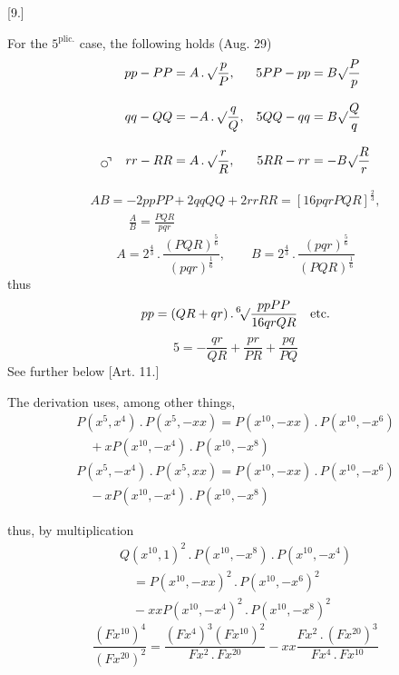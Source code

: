 \begingroup
\renewcommand{\arraystretch}{1.45}
\providecommand{\GaussCircleArrow}{\ensuremath{\mathord{\vcenter{\hbox{\setlength{\unitlength}{1pt}\begin{picture}(10,11)\linethickness{.55pt}\put(3.3,3.3){\circle{5.2}}\put(5.1,5.1){\line(1,1){3.2}}\put(5.6,8.3){\line(1,0){2.7}}\put(8.3,5.6){\line(0,1){2.7}}\end{picture}}}}}}

\par\medskip{}\centerline{[9.]}\nobreak\smallskip
For the $5^{\mathrm{plic.}}$ case, the following holds (Aug. 29)
\[
\begin{aligned}
pp-PP&= A\,.\,\surd\frac{p}{P}, &5PP-pp&=B\surd\frac{P}{p}\\[8pt]
qq-QQ&=-A\,.\,\surd\frac{q}{Q}, &5QQ-qq&=B\surd\frac{Q}{q}\\[8pt]
\GaussCircleArrow\quad rr-RR&=A\,.\,\surd\frac{r}{R},
&5RR-rr&=-B\surd\frac{R}{r}
\end{aligned}
\]

\[
\begin{gathered}AB=-2ppPP+2qqQQ+2rrRR=[16pqrPQR]^{\frac23},
\\[8pt]\quad{}\qquad\frac{A}{B}=\frac{PQR}{pqr}\end{gathered}
\]
\[
A=2^{\frac43}\,.\,\frac{(PQR)^{\frac56}}{(pqr)^{\frac16}},
\qquad B=2^{\frac43}\,.\,\frac{(pqr)^{\frac56}}{(PQR)^{\frac16}}
\]
thus
\[
pp=(QR+qr)\,.\,\mathord{{}^{6}\!\surd}\frac{ppPP}{16qrQR}\quad\text{etc.}
\]
\[
5=-\frac{qr}{QR}+\frac{pr}{PR}+\frac{pq}{PQ}
\]
See further below [Art. 11.]


The derivation uses, among other things,
\[
\begin{gathered}
P(x^5,x^4)\,.\,P(x^5,-xx)
=P(x^{10},-xx)\,.\,P(x^{10},-x^6)\\[8pt]\quad{}+xP(x^{10},-x^4)\,.\,P(x^{10},-x^8)\\[8pt]
P(x^5,-x^4)\,.\,P(x^5,xx)
=P(x^{10},-xx)\,.\,P(x^{10},-x^6)\\[8pt]\quad{}-xP(x^{10},-x^4)\,.\,
P(x^{10},-x^8)
\end{gathered}
\]


thus, by multiplication
\[
\begin{gathered}
Q(x^{10},1)^2\, .\,P(x^{10},-x^8)\, .\,P(x^{10},-x^4)\\[8pt]
\quad=P(x^{10},-xx)^2\, .\,P(x^{10},-x^6)^2\\[8pt]\quad{}-xxP(x^{10},-x^4)^2\, .\,P(x^{10},-x^8)^2
\end{gathered}
\]
\[
\frac{(Fx^{10})^4}{(Fx^{20})^2}
=\frac{(Fx^4)^3(Fx^{10})^2}{Fx^2\, .\,Fx^{20}}
-xx\frac{Fx^2\, .\,(Fx^{20})^3}{Fx^4\, .\,Fx^{10}}
\]

